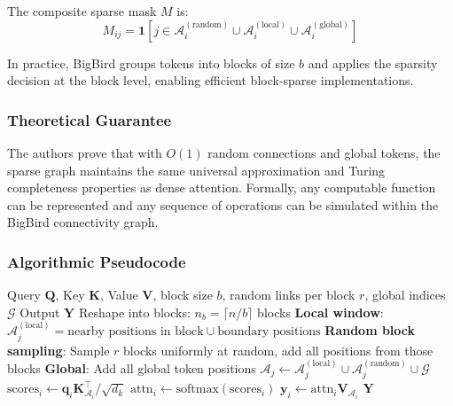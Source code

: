 \documentclass[11pt,a4paper]{article}
\begin{document}
The composite sparse mask $M$ is:
\[
M_{ij} = \mathbf{1}[j \in \mathcal{A}_i^{(\text{random})} \cup \mathcal{A}_i^{(\text{local})} \cup \mathcal{A}_i^{(\text{global})}]
\]

In practice, BigBird groups tokens into blocks of size $b$ and applies the sparsity decision at the block level, enabling efficient block-sparse implementations.

\subsubsection{Theoretical Guarantee}

The authors prove that with $O(1)$ random connections and global tokens, the sparse graph maintains the same universal approximation and Turing completeness properties as dense attention. Formally, any computable function can be represented and any sequence of operations can be simulated within the BigBird connectivity graph.

\subsubsection{Algorithmic Pseudocode}

\begin{algorithm}[H]
\caption{BigBird: Random + Local + Global Block-Sparse Attention}
\begin{algorithmic}[1]
\Require Query $\mathbf{Q}$, Key $\mathbf{K}$, Value $\mathbf{V}$, block size $b$, random links per block $r$, global indices $\mathcal{G}$
\Ensure Output $\mathbf{Y}$
\State Reshape into blocks: $n_b = \lceil n / b \rceil$ blocks
        \State \textbf{Local window}: $\mathcal{A}_j^{(\text{local})} = \text{nearby positions in block} \cup \text{boundary positions}$
        \State \textbf{Random block sampling}: Sample $r$ blocks uniformly at random, add all positions from those blocks
        \State \textbf{Global}: Add all global token positions
        \State $\mathcal{A}_j \gets \mathcal{A}_j^{(\text{local})} \cup \mathcal{A}_j^{(\text{random})} \cup \mathcal{G}$
    \EndFor
\EndFor
{}
    \State $\text{scores}_i \gets \mathbf{q}_i \mathbf{K}_{\mathcal{A}_i}^\top / \sqrt{d_k}$
    \State $\text{attn}_i \gets \text{softmax}(\text{scores}_i)$
    \State $\mathbf{y}_i \gets \text{attn}_i \mathbf{V}_{\mathcal{A}_i}$
\EndFor
\Return $\mathbf{Y}$
\end{algorithmic}
\end{algorithm}
\end{document}
